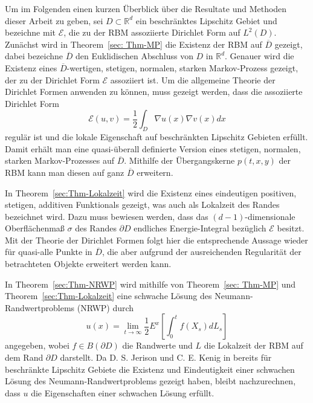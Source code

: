 \documentclass[10pt, a4paper, leqno, twoside, bibliography=totocnumbered, final]{scrartcl}
\theoremstyle{definition}
\theoremstyle{plain}%
\theoremstyle{remark}
\begin{document}
Um im Folgenden einen kurzen Überblick über die Resultate und Methoden dieser Arbeit zu geben,  sei $ D \subset \mathbb{R}^d $ ein beschränktes Lipschitz Gebiet und bezeichne mit  $ \mathcal{E} $, die zu der RBM assoziierte Dirichlet Form auf $ L^2(D) $. Zunächst wird in Theorem~\ref{sec: Thm-MP} die Existenz der RBM auf $ \overline{D} $ gezeigt, dabei bezeichne $ \overline{D} $ den Euklidischen Abschluss von $ D $ in $ \mathbb{R}^d $. Genauer wird die Existenz eines $ \overline{D} $-wertigen, stetigen, normalen, starken Markov-Prozess gezeigt, der zu der Dirichlet Form $ \mathcal{E} $ assoziiert ist. Um die allgemeine Theorie der Dirichlet Formen anwenden zu können, muss gezeigt werden, dass die assoziierte Dirichlet Form
\begin{equation*}
\mathcal{E}(u,v) = \frac{1}{2} \int_{D} \nabla u(x) \nabla v (x) dx
\end{equation*} 
regulär ist und die lokale Eigenschaft auf beschränkten Lipschitz Gebieten erfüllt. Damit erhält man eine quasi-überall definierte Version eines stetigen, normalen, starken Markov-Prozesses auf $ \overline{D} $. Mithilfe der Übergangskerne $ p(t,x,y) $ der RBM kann man diesen auf ganz $ \overline{D} $ erweitern.

In Theorem~\ref{sec:Thm-Lokalzeit} wird die Existenz eines eindeutigen positiven, stetigen, additiven Funktionals gezeigt, was auch als Lokalzeit des Randes bezeichnet wird. Dazu muss bewiesen werden, dass das $ (d-1) $-dimensionale Oberflächenmaß $ \sigma $ des Randes $ \partial D $ endliches Energie-Integral bezüglich $ \mathcal{E} $ besitzt. Mit der Theorie der Dirichlet Formen folgt hier die entsprechende Aussage wieder für quasi-alle Punkte in $ \overline{D} $, die aber aufgrund der ausreichenden Regularität der betrachteten Objekte erweitert werden kann.

In Theorem~\ref{sec:Thm-NRWP} wird mithilfe von Theorem~\ref{sec: Thm-MP} und Theorem~\ref{sec:Thm-Lokalzeit} eine schwache Lösung des Neumann-Randwertproblems (NRWP) durch
\begin{equation*}
u(x) = \lim_{t \to \infty} \frac{1}{2} E^x \left[ \int_0^t f(X_s) dL_s \right]
\end{equation*}
angegeben, wobei $ f \in B(\partial D) $ die Randwerte und $ L $ die Lokalzeit der RBM auf dem Rand $ \partial D $ darstellt. Da D. S. Jerison und C. E. Kenig in \cite{Jerison-Kenig} bereits für beschränkte Lipschitz Gebiete die Existenz und Eindeutigkeit einer schwachen Lösung des Neumann-Randwertproblems gezeigt haben, bleibt nachzurechnen, dass $ u $ die Eigenschaften einer schwachen Lösung erfüllt.
\end{document}
